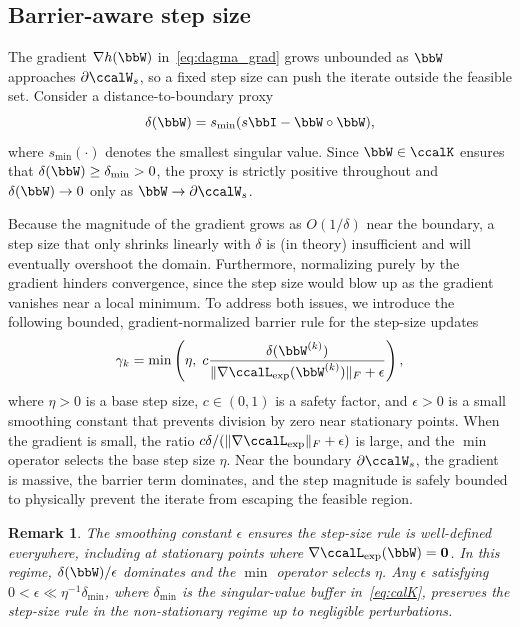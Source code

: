 \documentclass[conference]{IEEEtran}
\newtheorem{remark}{\bf Remark}
\newcommand{\Lext}{\ccalL_{\mathrm{exp}}}
\newcommand{\sms}[1]{{\color{cyan}{[SS: #1]}}}
\begin{document}
	
	\subsection{Barrier-aware step size}\label{ssec:barrier_ss}
	
	The gradient $\nabla h(\bbW)$ in~\eqref{eq:dagma_grad} grows unbounded as $\bbW$ approaches $\partial \ccalW_s$, so a fixed step size can push the iterate outside the feasible set. Consider a distance-to-boundary proxy
	\begin{equation}\label{eq:delta}
		\delta(\bbW) = s_{\min}(s\bbI - \bbW \circ \bbW),
	\end{equation}
	where $s_{\min}(\cdot)$ denotes the smallest singular value. Since $\bbW \in \ccalK$ ensures that $\delta(\bbW) \geq \delta_{\min} > 0$, the proxy is strictly positive throughout and $\delta(\bbW) \to 0$ only as $\bbW \to \partial \ccalW_s$.
	
	Because the magnitude of the gradient grows as $O(1/\delta)$ near the boundary, a step size that only shrinks linearly with $\delta$ is (in theory) insufficient and will eventually overshoot the domain. Furthermore, normalizing purely by the gradient hinders convergence, since the step size would blow up as the gradient vanishes near a local minimum. To address both issues, we introduce the following bounded, gradient-normalized barrier rule for the step-size updates
	\begin{equation}\label{eq:step_size}
		\gamma_k = \min\left( \eta, \; c \frac{\delta(\bbW^{(k)})}{\|\nabla \Lext(\bbW^{(k)})\|_F + \epsilon} \right),
	\end{equation}
	where $\eta > 0$ is a base step size, $c \in (0, 1)$ is a safety factor, and $\epsilon > 0$ is a small smoothing constant that prevents division by zero near stationary points. When the gradient is small, the ratio $c\delta/(\|\nabla\Lext\|_F + \epsilon)$ is large, and the $\min$ operator selects the base step size $\eta$. Near the boundary $\partial \ccalW_s$, the gradient is massive, the barrier term dominates, and the step magnitude is safely bounded to physically prevent the iterate from escaping the feasible region.
	\begin{remark}
		The smoothing constant $\epsilon$ ensures the step-size rule is well-defined everywhere, including at stationary points where $\nabla \Lext(\bbW) = \mathbf{0}$. In this regime, $\delta(\bbW) / \epsilon$ dominates and the $\min$ operator selects $\eta$. Any $\epsilon$ satisfying $0 < \epsilon \ll \eta^{-1} \delta_{\min}$, where $\delta_{\min}$ is the singular-value buffer in~\eqref{eq:calK}, preserves the step-size rule in the non-stationary regime up to negligible perturbations.
	\end{remark}
	
\end{document}
